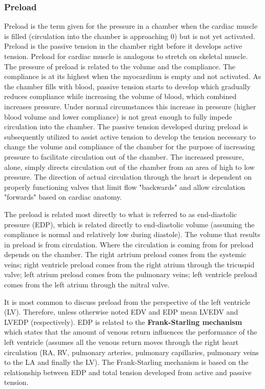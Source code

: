 \subsubsection{Preload}

Preload is the term given for the pressure in a chamber when the cardiac muscle is filled (circulation into the chamber is approaching 0) but is not yet activated. Preload is the passive tension in the chamber right before it develops active tension. Preload for cardiac muscle is analogous to stretch on skeletal muscle. The pressure of preload is related to the volume and the compliance. The compliance is at its highest when the myocardium is empty and not activated. As the chamber fills with blood, passive tension starts to develop which gradually reduces compliance while increasing the volume of blood, which combined increases pressure. Under normal circumstances this increase in pressure (higher blood volume and lower compliance) is not great enough to fully impede circulation into the chamber. The passive tension developed during preload is subsequently utilized to assist active tension to develop the tension necessary to change the volume and compliance of the chamber for the purpose of increasing pressure to facilitate circulation out of the chamber. The increased pressure, alone, simply directs circulation out of the chamber from an area of high to low pressure. The direction of actual circulation through the heart is dependent on properly functioning valves that limit flow "backwards" and allow circulation "forwards" based on cardiac anatomy.

The preload is related most directly to what is referred to as end-diastolic pressure (EDP), which is related directly to end-diastolic volume (assuming the compliance is normal and relatively low during diastole). The volume that results in preload is from circulation. Where the circulation is coming from for preload depends on the chamber. The right artrium preload comes from the systemic veins; right ventricle preload comes from the right atrium through the tricuspid valve; left atrium preload comes from the pulmonary veins; left ventricle preload comes from the left atrium through the mitral valve. 

It is most common to discuss preload from the perspective of the left ventricle (LV). Therefore, unless otherwise noted EDV and EDP mean LVEDV and LVEDP (respectively). EDP is related to the \textbf{Frank-Starling mechanism} which states that the amount of venous return influences the performance of the left ventricle (assumes all the venous return moves through the right heart circulation (RA, RV, pulmonary arteries, pulmonary capillaries, pulmonary veins to the LA and finally the LV). The Frank-Starling mechanism is based on the relationship between EDP and total tension developed from active and passive tension.

